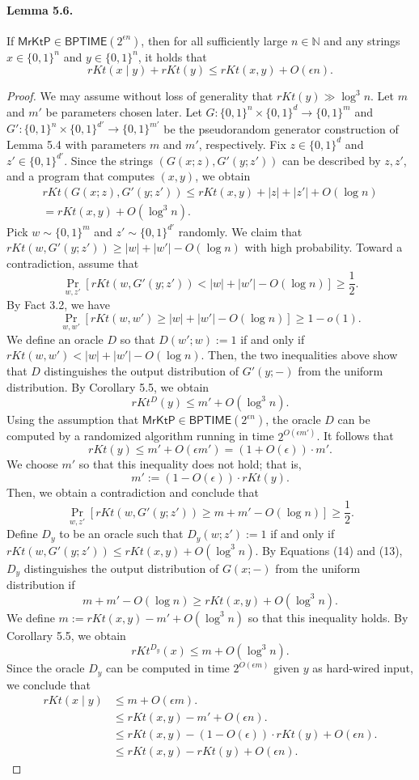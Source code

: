 \paragraph{Lemma 5.6.}
If $\mathsf{MrKtP}\in\mathsf{BPTIME}(2^{\epsilon n})$, then for all sufficiently large $n\in\mathbb N$ and any strings $x\in\{0,1\}^n$ and $y\in\{0,1\}^n$, it holds that
\[rKt(x\mid y)+rKt(y)\leq rKt(x,y)+O(\epsilon n).\]
\begin{proof}
We may assume without loss of generality that $rKt(y)\gg\log^3 n$. Let $m$ and $m'$ be parameters chosen later. Let $G:\{0,1\}^n\times\{0,1\}^d\to\{0,1\}^m$ and $G':\{0,1\}^n\times\{0,1\}^{d'}\to\{0,1\}^{m'}$ be the pseudorandom generator construction of Lemma 5.4 with parameters $m$ and $m'$, respectively.
Fix $z\in\{0,1\}^d$ and $z'\in\{0,1\}^{d'}$. Since the strings $(G(x;z),G'(y;z'))$ can be described by $z,z'$, and a program that computes $(x,y)$, we obtain
\begin{multline*}
rKt(G(x;z),G'(y;z'))\leq rKt(x,y)+|z|+|z'|+O(\log n)\\
=rKt(x,y)+O(\log^3 n).\tag{13}
\end{multline*}
Pick $w\sim\{0,1\}^m$ and $z'\sim\{0,1\}^{d'}$ randomly. We claim that $rKt(w,G'(y;z'))\geq|w|+|w'|-O(\log n)$ with high probability. Toward a contradiction, assume that
\[\Pr_{w,z'}[rKt(w,G'(y;z'))<|w|+|w'|-O(\log n)]\geq\frac12.\]
By Fact 3.2, we have
\[\Pr_{w,w'}[rKt(w,w')\geq|w|+|w'|-O(\log n)]\geq1-o(1).\]
We define an oracle $D$ so that $D(w';w):=1$ if and only if $rKt(w,w')<|w|+|w'|-O(\log n)$. Then, the two inequalities above show that $D$ distinguishes the output distribution of $G'(y;-)$ from the uniform distribution. By Corollary 5.5, we obtain
\[rKt^D(y)\leq m'+O(\log^3 n).\]
Using the assumption that $\mathsf{MrKtP}\in\mathsf{BPTIME}(2^{\epsilon n})$, the oracle $D$ can be computed by a randomized algorithm running in time $2^{O(\epsilon m')}$. It follows that
\[rKt(y)\leq m'+O(\epsilon m')=(1+O(\epsilon))\cdot m'.\]
We choose $m'$ so that this inequality does not hold; that is,
\[m':=(1-O(\epsilon))\cdot rKt(y).\]
Then, we obtain a contradiction and conclude that
\[\Pr_{w,z'}[rKt(w,G'(y;z'))\geq m+m'-O(\log n)]\geq\frac12.\tag{14}\]
Define $D_y$ to be an oracle such that $D_y(w;z'):=1$ if and only if $rKt(w,G'(y;z'))\leq rKt(x,y)+O(\log^3n)$. By Equations (14) and (13), $D_y$ distinguishes the output distribution of $G(x;-)$ from the uniform distribution if
\[m+m'-O(\log n)\geq rKt(x,y)+O(\log^3 n).\]
We define $m:=rKt(x,y)-m'+O(\log^3n)$ so that this inequality holds. By Corollary 5.5, we obtain
\[rKt^{D_y}(x)\leq m+O(\log^3n).\]
Since the oracle $D_y$ can be computed in time $2^{O(\epsilon m)}$ given $y$ as hard-wired input, we conclude that
\begin{align*}
rKt(x\mid y)&\leq m+O(\epsilon m).\\
&\leq rKt(x,y)-m'+O(\epsilon n).\\
&\leq rKt(x,y)-(1-O(\epsilon))\cdot rKt(y)+O(\epsilon n).\\
&\leq rKt(x,y)-rKt(y)+O(\epsilon n).
\end{align*}
\end{proof}
